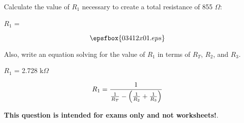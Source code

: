 

Calculate the value of $R_1$ necessary to create a total resistance of 855 $\Omega$:

\vskip 10pt

$R_1$ = 

$$\epsfbox{03412x01.eps}$$

Also, write an equation solving for the value of $R_1$ in terms of $R_T$, $R_2$, and $R_3$.







$R_1$ = 2.728 k$\Omega$

$$R_1 = {1 \over { {1 \over R_T} - \left( {1 \over R_2} + {1 \over R_3} \right)}}$$







{\bf This question is intended for exams only and not worksheets!}.



